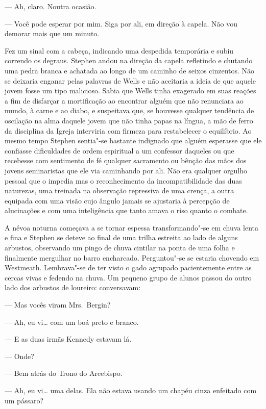 --- Ah, claro.  Noutra ocasião.

--- Você pode esperar por mim.  Siga por ali, em direção à
capela.  Não vou demorar mais que um minuto.

Fez um sinal com a cabeça, indicando uma despedida temporária e
subiu correndo os degraus. Stephen andou na direção da capela		
refletindo e chutando uma pedra branca e achatada ao longo de um		
caminho de seixos cinzentos.  Não se deixaria enganar pelas palavras de
Wells e não aceitaria a ideia de que aquele jovem fosse um tipo
malicioso.  Sabia que Wells tinha exagerado em suas reações a fim de
disfarçar a mortificação ao encontrar alguém que não renunciara ao
mundo, à carne e ao diabo, e suspeitava que, se houvesse qualquer
tendência de oscilação na alma daquele jovem que não tinha papas na
língua, a mão de ferro da disciplina da Igreja interviria com firmeza
para restabelecer o equilíbrio.  Ao mesmo tempo Stephen sentia"-se
bastante indignado que alguém esperasse que ele confiasse dificuldades
de ordem espiritual a um confessor daqueles ou que recebesse com
sentimento de fé qualquer sacramento ou bênção das mãos dos jovens
seminaristas que ele via caminhando por ali.  Não era qualquer orgulho
pessoal que o impedia mas o reconhecimento da incompatibilidade das
duas naturezas, uma treinada na observação repressiva de uma crença, a
outra equipada com uma visão cujo ângulo jamais se ajustaria à
percepção de alucinações e com uma inteligência \label{que"-tanto} que tanto amava o riso
quanto o combate.

A névoa noturna começava a se tornar espessa transformando"-se em
chuva lenta e fina e Stephen se deteve ao final de uma trilha estreita
ao lado de alguns arbustos, observando um pingo de chuva cintilar na
ponta de uma folha e finalmente mergulhar no barro encharcado.
Perguntou"-se se estaria chovendo em Westmeath.  Lembrava"-se de ter
visto o gado agrupado pacientemente entre as cercas vivas e fedendo na
chuva.  Um pequeno grupo de alunos passou do outro lado dos arbustos de
loureiro: conversavam:

--- Mas vocês viram Mrs.~Bergin?

--- Ah, eu vi\ldots{} com um boá preto e branco.

--- E as duas irmãs Kennedy estavam lá.

--- Onde?

--- Bem atrás do Trono do Arcebispo.

--- Ah, eu vi\ldots{} uma delas.  Ela não estava usando um chapéu
cinza enfeitado com um pássaro?


